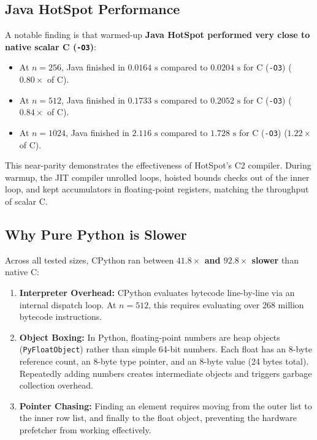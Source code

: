 \documentclass[10pt,conference,a4paper]{IEEEtran}
\begin{document}
\subsection{Java HotSpot Performance}
A notable finding is that warmed-up \textbf{Java HotSpot performed very close to native scalar C (\texttt{-O3})}:
\begin{itemize}
    \item At $n=256$, Java finished in $0.0164\text{ s}$ compared to $0.0204\text{ s}$ for C (\texttt{-O3}) ($0.80\times$ of C).
    \item At $n=512$, Java finished in $0.1733\text{ s}$ compared to $0.2052\text{ s}$ for C (\texttt{-O3}) ($0.84\times$ of C).
    \item At $n=1024$, Java finished in $2.116\text{ s}$ compared to $1.728\text{ s}$ for C (\texttt{-O3}) ($1.22\times$ of C).
\end{itemize}
This near-parity demonstrates the effectiveness of HotSpot's C2 compiler. During warmup, the JIT compiler unrolled loops, hoisted bounds checks out of the inner loop, and kept accumulators in floating-point registers, matching the throughput of scalar C.

\subsection{Why Pure Python is Slower}
Across all tested sizes, CPython ran between \textbf{$41.8\times$ and $92.8\times$ slower} than native C:
\begin{enumerate}
    \item \textbf{Interpreter Overhead:} CPython evaluates bytecode line-by-line via an internal dispatch loop. At $n=512$, this requires evaluating over 268 million bytecode instructions.
    \item \textbf{Object Boxing:} In Python, floating-point numbers are heap objects (\texttt{PyFloatObject}) rather than simple 64-bit numbers. Each float has an 8-byte reference count, an 8-byte type pointer, and an 8-byte value (24 bytes total). Repeatedly adding numbers creates intermediate objects and triggers garbage collection overhead.
    \item \textbf{Pointer Chasing:} Finding an element requires moving from the outer list to the inner row list, and finally to the float object, preventing the hardware prefetcher from working effectively.
\end{enumerate}
\end{document}
